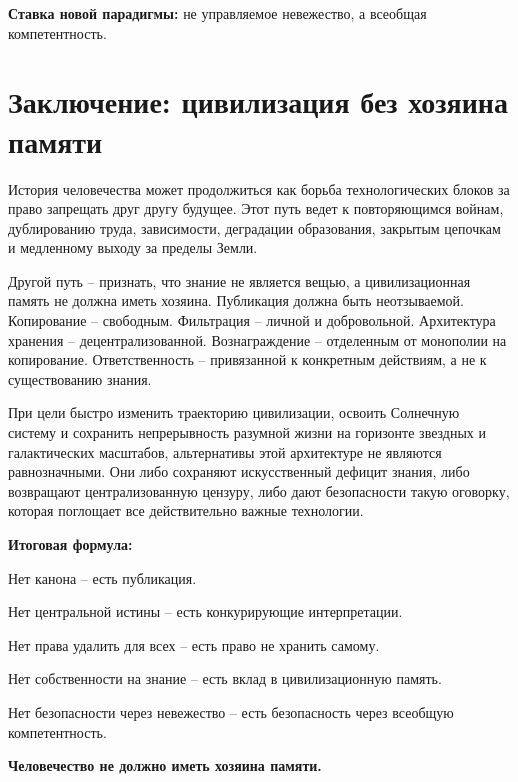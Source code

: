 \documentclass[11pt,a4paper]{article}
\begin{document}
\begin{executivebox}
\textbf{Ставка новой парадигмы:} не управляемое невежество, а всеобщая компетентность.
\end{executivebox}

\section{Заключение: цивилизация без хозяина памяти}

История человечества может продолжиться как борьба технологических блоков за право запрещать друг другу будущее. Этот путь ведет к повторяющимся войнам, дублированию труда, зависимости, деградации образования, закрытым цепочкам и медленному выходу за пределы Земли.

Другой путь -- признать, что знание не является вещью, а цивилизационная память не должна иметь хозяина. Публикация должна быть неотзываемой. Копирование -- свободным. Фильтрация -- личной и добровольной. Архитектура хранения -- децентрализованной. Вознаграждение -- отделенным от монополии на копирование. Ответственность -- привязанной к конкретным действиям, а не к существованию знания.

При цели быстро изменить траекторию цивилизации, освоить Солнечную систему и сохранить непрерывность разумной жизни на горизонте звездных и галактических масштабов, альтернативы этой архитектуре не являются равнозначными. Они либо сохраняют искусственный дефицит знания, либо возвращают централизованную цензуру, либо дают безопасности такую оговорку, которая поглощает все действительно важные технологии.

\begin{decisionbox}
\textbf{Итоговая формула:}

Нет канона -- есть публикация.\par
Нет центральной истины -- есть конкурирующие интерпретации.\par
Нет права удалить для всех -- есть право не хранить самому.\par
Нет собственности на знание -- есть вклад в цивилизационную память.\par
Нет безопасности через невежество -- есть безопасность через всеобщую компетентность.\par
\vspace{2mm}
\textbf{Человечество не должно иметь хозяина памяти.}
\end{decisionbox}

\clearpage
\end{document}
